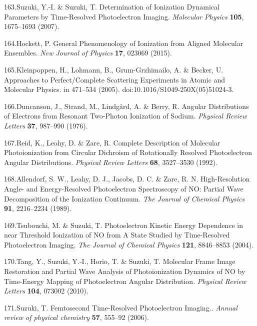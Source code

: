 \documentclass[10pt]{article}
\begin{document}
\label{csl:163}163.Suzuki, Y.-I. \& Suzuki, T. {Determination of Ionization Dynamical Parameters by Time-Resolved Photoelectron Imaging}. \textit{Molecular Physics} \textbf{105}, 1675–1693 (2007).

\label{csl:164}164.Hockett, P. {General Phenomenology of Ionization from Aligned Molecular Ensembles}. \textit{New Journal of Physics} \textbf{17}, 023069 (2015).

\label{csl:165}165.Kleinpoppen, H., Lohmann, B., {Grum-Grzhimailo}, A. \& Becker, U. {Approaches to {{Perfect}}/{{Complete Scattering Experiments}} in {{Atomic}} and {{Molecular Physics}}}. in 471–534 (2005). doi:10.1016/S1049-250X(05)51024-3.

\label{csl:166}166.Duncanson, J., Strand, M., Lindg{\aa}rd, A. \& Berry, R. {Angular {{Distributions}} of {{Electrons}} from {{Resonant Two}}-{{Photon Ionization}} of {{Sodium}}}. \textit{Physical Review Letters} \textbf{37}, 987–990 (1976).

\label{csl:167}167.Reid, K., Leahy, D. \& Zare, R. {Complete Description of Molecular Photoionization from Circular Dichroism of Rotationally Resolved Photoelectron Angular Distributions}. \textit{Physical Review Letters} \textbf{68}, 3527–3530 (1992).

\label{csl:168}168.Allendorf, S. W., Leahy, D. J., Jacobs, D. C. \& Zare, R. N. {High-Resolution Angle- and Energy-Resolved Photoelectron Spectroscopy of {{NO}}: {{Partial}} Wave Decomposition of the Ionization Continuum}. \textit{The Journal of Chemical Physics} \textbf{91}, 2216–2234 (1989).

\label{csl:169}169.Tsubouchi, M. \& Suzuki, T. {Photoelectron Kinetic Energy Dependence in near Threshold Ionization of {{NO}} from {{A}} State Studied by Time-Resolved Photoelectron Imaging}. \textit{The Journal of Chemical Physics} \textbf{121}, 8846–8853 (2004).

\label{csl:170}170.Tang, Y., Suzuki, Y.-I., Horio, T. \& Suzuki, T. {Molecular {{Frame Image Restoration}} and {{Partial Wave Analysis}} of {{Photoionization Dynamics}} of {{NO}} by {{Time}}-{{Energy Mapping}} of {{Photoelectron Angular Distribution}}}. \textit{Physical Review Letters} \textbf{104}, 073002 (2010).

\label{csl:171}171.Suzuki, T. {Femtosecond Time-Resolved Photoelectron Imaging.}. \textit{Annual review of physical chemistry} \textbf{57}, 555–92 (2006).
\end{document}
